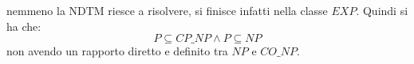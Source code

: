 nemmeno la NDTM riesce a risolvere, si finisce infatti nella classe
$EXP$. Quindi si ha che:
\[P\subseteq CP\_NP\land P\subseteq NP\]
non avendo un rapporto diretto e definito tra $NP$ e $CO\_NP$.
